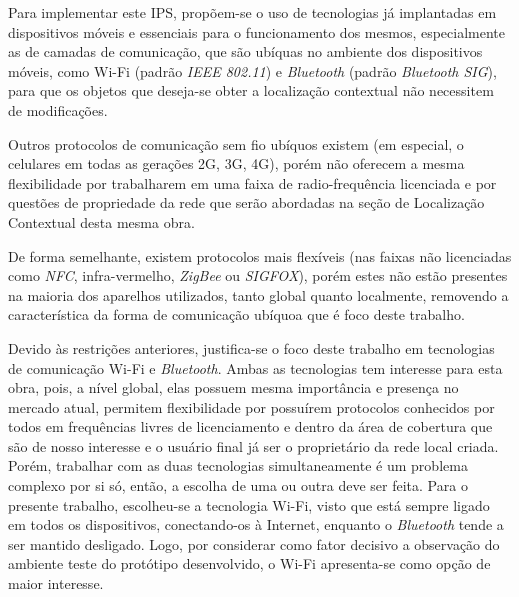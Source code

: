 Para implementar este IPS, propõem-se o uso de tecnologias já implantadas em
dispositivos móveis e essenciais para o funcionamento dos mesmos, especialmente
as de camadas de comunicação, que são ubíquas no ambiente dos dispositivos
móveis, como Wi-Fi (padrão \emph{IEEE 802.11}) e \emph{Bluetooth}
(padrão \emph{Bluetooth SIG}), para que os objetos que deseja-se obter a localização
contextual não necessitem de modificações.

Outros protocolos de comunicação sem fio ubíquos existem (em especial, o
celulares em todas as gerações 2G, 3G, 4G), porém não oferecem a mesma
flexibilidade por trabalharem em uma faixa de radio-frequência licenciada e por
questões de propriedade da rede que serão abordadas na seção de Localização
Contextual desta mesma obra.

De forma semelhante, existem protocolos mais flexíveis (nas faixas não
licenciadas como \emph{NFC}, infra-vermelho, \emph{ZigBee} ou
\emph{SIGFOX}), porém estes não estão presentes na maioria dos aparelhos
utilizados, tanto global quanto localmente, removendo a característica da
forma de comunicação ubíquoa que é foco deste trabalho.

Devido às restrições anteriores, justifica-se o foco deste trabalho em tecnologias de
comunicação Wi-Fi e \emph{Bluetooth}. Ambas as tecnologias
tem interesse para esta obra, pois, a nível global, elas possuem mesma importância e presença no mercado atual, permitem
flexibilidade por possuírem protocolos conhecidos por todos em frequências
livres de licenciamento e dentro da área de cobertura que são de nosso interesse
e o usuário final já ser o proprietário da rede local criada. Porém, trabalhar com as duas
tecnologias simultaneamente é um problema complexo por si só, então, a escolha
de uma ou outra deve ser feita. Para o presente trabalho, escolheu-se a tecnologia Wi-Fi, visto que está sempre
ligado em todos os dispositivos, conectando-os à Internet, enquanto o \emph{Bluetooth} tende
a ser mantido desligado. Logo, por considerar como fator decisivo a observação do ambiente teste do protótipo
desenvolvido, o Wi-Fi apresenta-se como opção de maior interesse.
